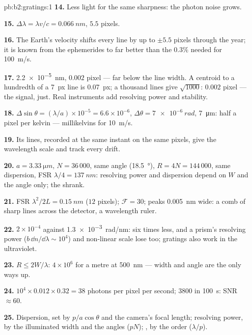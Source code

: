 \begin{solution}{pb:b2:gratings:1}
\textbf{14.} Less light for the same sharpness: the photon noise grows.

\textbf{15.} $\Delta\lambda = \lambda v/c = \qty{0.066}{nm}$, $5.5$ pixels.

\textbf{16.} The Earth's velocity shifts every line by up to $\pm5.5$
pixels through the year; it is known from the ephemerides to far
better than the $0.3\%$ needed for \qty{100}{m/s}.

\textbf{17.} \qty{2.2e-5}{nm}, $0.002$ pixel --- far below the line width. A
centroid to a hundredth of a \qty{7}{px} line is \qty{0.07}{px}; a thousand
lines give $\sqrt{1000}$: $0.002$ pixel --- the signal, just. Real
instruments add resolving power and stability.

\textbf{18.} $\Delta\sin\theta = (\lambda/a) \times 10^{-5} = 6.6 \times 10^{-6}$, $\Delta\theta = \qty{7e-6}{rad}$,
\qty{7}{\micro m}: half a pixel per kelvin --- millikelvins for \qty{10}{m/s}.

\textbf{19.} Its lines, recorded at the same instant on the same
pixels, give the wavelength scale and track every drift.

\textbf{20.} $a = \qty{3.33}{\micro m}$, $N = 36\,000$, same angle (\qty{18.5}{\degree}), $R = 4N
= 144\,000$, same dispersion, FSR $\lambda/4 = \qty{137}{nm}$: resolving power and
dispersion depend on $W$ and the angle only; the 
shrank.

\textbf{21.} FSR $\lambda^2/2L = \qty{0.15}{nm}$ ($12$ pixels); $\mathcal F = 30$; peaks
\qty{0.005}{nm} wide: a comb of sharp lines across the detector, a
wavelength ruler.

\textbf{22.} $2 \times 10^{-4}$ against \qty{1.3e-3}{rad/nm}: six times less, and a
prism's resolving power ($b\,\dd n/\dd\lambda \sim 10^4$) and non-linear scale
lose too; gratings also work in the ultraviolet.

\textbf{23.} $R \le 2W/\lambda$: $4 \times 10^6$ for a metre at \qty{500}{nm} --- width and
angle are the only ways up.

\textbf{24.} $10^4 \times 0.012 \times 0.32 = 38$ photons per pixel per second; $3800$
in \qty{100}{s}: SNR $\approx 60$.

\textbf{25.} Dispersion, set by $p/a\cos\theta$ and the camera's focal length;
resolving power, by the illuminated width and the angles ($pN$);
, by the order ($\lambda/p$).
\end{solution}
